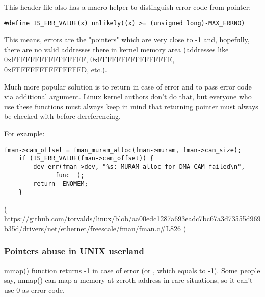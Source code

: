 This header file also has a macro helper to distinguish error code from pointer:

\begin{lstlisting}[style=customc]
#define IS_ERR_VALUE(x) unlikely((x) >= (unsigned long)-MAX_ERRNO)
\end{lstlisting}

This means, errors are the "pointers" which are very close to -1 and, hopefully, there are no valid addresses there in kernel memory area
(addresses like 0xFFFFFFFFFFFFFFFF, 0xFFFFFFFFFFFFFFFE,\\
0xFFFFFFFFFFFFFFFD, etc.).

Much more popular solution is to return  in case of error and to pass error code via additional argument.
Linux kernel authors don't do that, but everyone who use these functions must always keep in mind that returning pointer
must always be checked with  before dereferencing.

For example:

\begin{lstlisting}[style=customc]
	fman->cam_offset = fman_muram_alloc(fman->muram, fman->cam_size);
	if (IS_ERR_VALUE(fman->cam_offset)) {
		dev_err(fman->dev, "%s: MURAM alloc for DMA CAM failed\n",
			__func__);
		return -ENOMEM;
	}
\end{lstlisting}

( \url{https://github.com/torvalds/linux/blob/aa00edc1287a693eadc7bc67a3d73555d969b35d/drivers/net/ethernet/freescale/fman/fman.c#L826} )

\subsubsection{Pointers abuse in UNIX userland}

mmap() function returns -1 in case of error (or , which equals to -1).
Some people say, mmap() can map a memory at zeroth address in rare situations, so it can't use 0 as error code.

